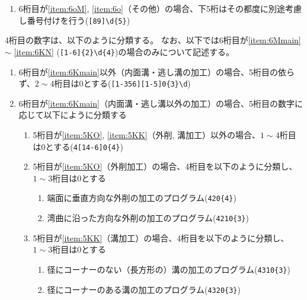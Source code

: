 \begin{enumerate}[label=\alph*)]
\begin{enumerate}[label=\arabic*., ref=\arabic*]
  \item\label{item:5KF} 端面の加工のプログラム(\verb|41\d{4}|)
  \item\label{item:5KO} 外削の加工のプログラム(\verb|42\d{4}|)
  \item\label{item:5KK} 溝の加工のプログラム(\verb|43\d{4}|)
  \item\label{item:5KCO} 外側面取の加工のプログラム(\verb|44\d{4}|)
  \item\label{item:5KCI} 内側面取の加工のプログラム(\verb|45\d{4}|)
  \item\label{item:5KZ} 座ぐりの加工のプログラム(\verb|46\d{4}|)
  \end{enumerate}
\item 6桁目が\ref{item:6oM}, \ref{item:6o}（その他）の場合、下5桁はその都度に別途考慮し番号付けを行う(\verb|[89]\d{5}|)
\end{enumerate}


4桁目の数字は、以下のように分類する。
なお、以下では6桁目が\ref{item:6Mmain} $\sim$ \ref{item:6KN} (\verb|[1-6]{2}\d{4}|)の場合のみについて記述する。
\begin{enumerate}[label=\alph*), ref=\alph*)]
\item 6桁目が\ref{item:6Kmain}\hx 以外（内面溝・逃し溝の加工）の場合、5桁目の依らず、$2\sim4$桁目は0とする(\verb|[1-356][1-5]0{3}\d|)
\item 6桁目が\ref{item:6Kmain}（内面溝・逃し溝以外の加工）の場合、5桁目の数字に応じて以下にように分類する
  \begin{enumerate}[label=\alph{enumi}\,-\arabic*), leftmargin=\leftmargini]
  \item 5桁目が\ref{item:5KO}, \ref{item:5KK}（外削, 溝加工）以外の場合、$1\sim4$桁目は0とする(\verb|4[14-6]0{4}|)
  \item 5桁目が\ref{item:5KO}（外削加工）の場合、4桁目を以下のように分類し、$1\sim3$桁目は0とする
    \begin{enumerate}[label=\arabic*., ref=\arabic*, start=0, leftmargin=*]
    \item 端面に垂直方向な外削の加工のプログラム(\verb|420{4}|)
    \item 湾曲に沿った方向な外削の加工のプログラム(\verb|4210{3}|)
    \end{enumerate}
  \item 5桁目が\ref{item:5KK}（溝加工）の場合、4桁目を以下のように分類し、$1\sim3$桁目は0とする
    \begin{enumerate}[label=\arabic*., ref=\arabic*, leftmargin=*]
    \item 径にコーナーのない（長方形の）溝の加工のプログラム(\verb|4310{3}|)
    \item 径にコーナーのある溝の加工のプログラム(\verb|4320{3}|)
    \end{enumerate}
  \end{enumerate}
\end{enumerate}



